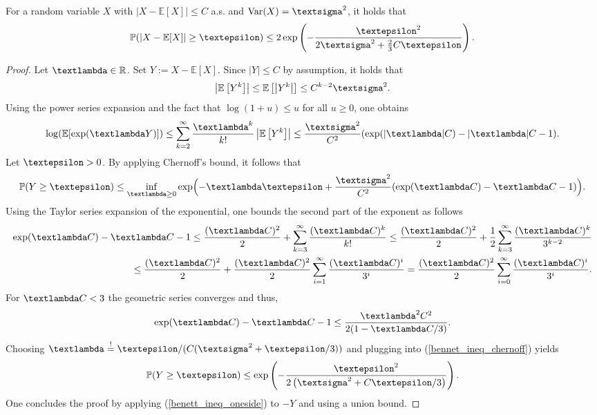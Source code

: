\documentclass[openany]{book}
\begin{document}
\begin{theorem}
For a random variable $X$ with $\vert X-\mathbb E[X]\vert \leq C$ a.s. and $\mathrm{Var}(X)=\gsigma^2$, it holds that
\begin{equation}\label{bennet_ineq}
    \mathbb P(\vert X-\mathbb E[X]\vert\geq \gepsilon)\leq 2\exp\left(-\frac{\gepsilon^2}{2\gsigma^2+\frac{2}{3}C\gepsilon}\right).
\end{equation}
\begin{proof}
    Let $\glambda\in \mathbb R$. Set $Y:=X-\mathbb E[X]$. Since $\vert Y\vert \leq C$ by assumption, it holds that
    \begin{equation*}
       \left\vert \mathbb E\left[Y^k\right]\right\vert \leq\mathbb E\left[\left\vert Y^k\right\vert\right]\leq C^{k-2}\gsigma^2.
    \end{equation*}
    Using the power series expansion and the fact that $\log(1+u)\leq u$ for all $u\geq 0$, one obtains
    \begin{equation*}
        \log(\mathbb E[\exp(\glambda Y)])\leq \sum_{k=2}^\infty \frac{\glambda^k}{k!}\left\vert \mathbb E\left[Y^k\right]\right\vert \leq \frac{\gsigma^2}{C^2}(\exp(\vert \glambda\vert C) - \vert \glambda\vert C- 1).
    \end{equation*}
    Let $\gepsilon>0$. By applying Chernoff's bound, it follows that
    \begin{equation}\label{bennet_ineq_chernoff}
        \mathbb P(Y\geq \gepsilon)\leq \inf_{\glambda\geq 0}\exp\Bigl(-\glambda \gepsilon+\frac{\gsigma^2}{C^2}(\exp(\glambda C)-\glambda C - 1)\Bigr).
    \end{equation}
    Using the Taylor series expansion of the exponential, one bounds the second part of the exponent as follows
    \begin{equation*}
    \begin{split}
        \exp(\glambda C)-\glambda C-1\leq \frac{(\glambda C)^2}{2}+\sum_{k=3}^\infty \frac{(\glambda C)^k}{k!}\leq \frac{(\glambda C)^2}{2}+\frac{1}{2}\sum_{k=3}^\infty\frac{(\glambda C)^k}{3^{k-2}}\\ 
        \leq \frac{(\glambda C)^2}{2}+\frac{(\glambda C)^2}{2}\sum_{i=1}^\infty \frac{(\glambda C)^i}{3^i} = \frac{(\glambda C)^2}{2}\sum_{i=0}^\infty\frac{(\glambda C)^i}{3^i}.
    \end{split}
    \end{equation*}
    For $\glambda C<3$ the geometric series converges and thus,
    \begin{equation}\label{bennet_ineq_taylor}
         \exp(\glambda C)-\glambda C-1\leq \frac{\glambda^2C^2}{2(1-\glambda C/3)}.
    \end{equation}
    Choosing $\glambda\overset{!}{=}\gepsilon/(C(\gsigma^2+ \gepsilon/3))$ and plugging into (\ref{bennet_ineq_chernoff}) yields
    \begin{equation}\label{benett_ineq_oneside}
        \mathbb P(Y\geq \gepsilon)\leq \exp\left(-\frac{\gepsilon^2}{2\left(\gsigma^2+C\gepsilon/3\right)}\right).
    \end{equation}
    One concludes the proof by applying (\ref{benett_ineq_oneside}) to $-Y$ and using a union bound.
\end{proof}
\end{theorem}
\end{document}
